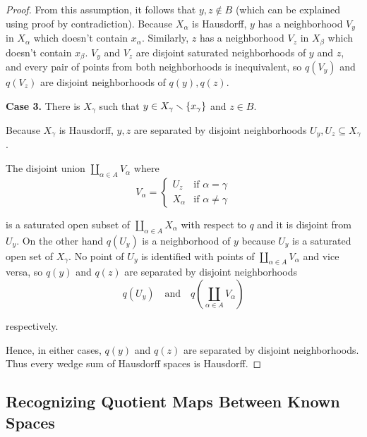 \begin{proof}
    From this assumption, it follows that $y, z\notin B$ (which can be explained using proof by contradiction). Because $X_{\alpha}$ is Hausdorff, $y$ has a neighborhood $V_{y}$ in $X_{\alpha}$ which doesn't contain $x_{\alpha}$. Similarly, $z$ has a neighborhood $V_{z}$ in $X_{\beta}$ which doesn't contain $x_{\beta}$. $V_{y}$ and $V_{z}$ are disjoint saturated neighborhoods of $y$ and $z$, and every pair of points from both neighborhoods is inequivalent, so $q(V_{y})$ and $q(V_{z})$ are disjoint neighborhoods of $q(y), q(z)$.

    \textbf{Case 3.} There is $X_{\gamma}$ such that $y\in X_{\gamma}\smallsetminus\left\{{x_{\gamma}}\right\}$ and $z\in B$.

    Because $X_{\gamma}$ is Hausdorff, $y, z$ are separated by disjoint neighborhoods $U_{y}, U_{z} \subseteq X_{\gamma}$.

    The disjoint union $\coprod_{\alpha\in A} V_{\alpha}$ where
    \begin{equation*}
        V_{\alpha} = \begin{cases}
            U_{z}      & \text{if $\alpha = \gamma$}   \\
            X_{\alpha} & \text{if $\alpha \ne \gamma$}
        \end{cases}
    \end{equation*}

    is a saturated open subset of $\coprod_{\alpha\in A}X_{\alpha}$ with respect to $q$ and it is disjoint from $U_{y}$. On the other hand $q(U_{y})$ is a neighborhood of $y$ because $U_{y}$ is a saturated open set of $X_{\gamma}$. No point of $U_{y}$ is identified with points of $\coprod_{\alpha\in A} V_{\alpha}$ and vice versa, so $q(y)$ and $q(z)$ are separated by disjoint neighborhoods
    \begin{equation*}
        q(U_{y}) \quad\text{and}\quad q\left(\coprod_{\alpha\in A} V_{\alpha}\right)
    \end{equation*}

    respectively.

    Hence, in either cases, $q(y)$ and $q(z)$ are separated by disjoint neighborhoods. Thus every wedge sum of Hausdorff spaces is Hausdorff.
\end{proof}

\subsection*{Recognizing Quotient Maps Between Known Spaces}

